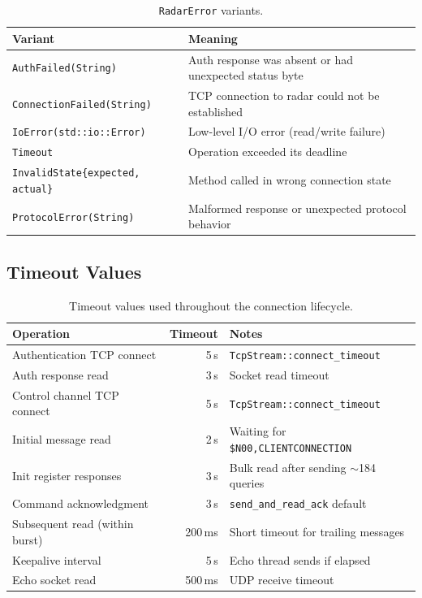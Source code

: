 \documentclass[11pt,letterpaper]{article}
\begin{document}
\begin{table}[H]
\centering
\begin{tabularx}{\textwidth}{l X}
\toprule
\textbf{Variant} & \textbf{Meaning} \\
\midrule
\texttt{AuthFailed(String)} & Auth response was absent or had unexpected status byte \\
\texttt{ConnectionFailed(String)} & TCP connection to radar could not be established \\
\texttt{IoError(std::io::Error)} & Low-level I/O error (read/write failure) \\
\texttt{Timeout} & Operation exceeded its deadline \\
\texttt{InvalidState\{expected, actual\}} & Method called in wrong connection state \\
\texttt{ProtocolError(String)} & Malformed response or unexpected protocol behavior \\
\bottomrule
\end{tabularx}
\caption{\texttt{RadarError} variants.}
\label{tab:radar-error}
\end{table}

\subsection{Timeout Values}
\label{subsec:timeouts}

\begin{table}[H]
\centering
\begin{tabular}{l r l}
\toprule
\textbf{Operation} & \textbf{Timeout} & \textbf{Notes} \\
\midrule
Authentication TCP connect & 5\,s & \texttt{TcpStream::connect\_timeout} \\
Auth response read & 3\,s & Socket read timeout \\
Control channel TCP connect & 5\,s & \texttt{TcpStream::connect\_timeout} \\
Initial message read & 2\,s & Waiting for \texttt{\$N00,CLIENTCONNECTION} \\
Init register responses & 3\,s & Bulk read after sending $\sim$184 queries \\
Command acknowledgment & 3\,s & \texttt{send\_and\_read\_ack} default \\
Subsequent read (within burst) & 200\,ms & Short timeout for trailing messages \\
Keepalive interval & 5\,s & Echo thread sends if elapsed \\
Echo socket read & 500\,ms & UDP receive timeout \\
\bottomrule
\end{tabular}
\caption{Timeout values used throughout the connection lifecycle.}
\label{tab:timeouts}
\end{table}
\end{document}
